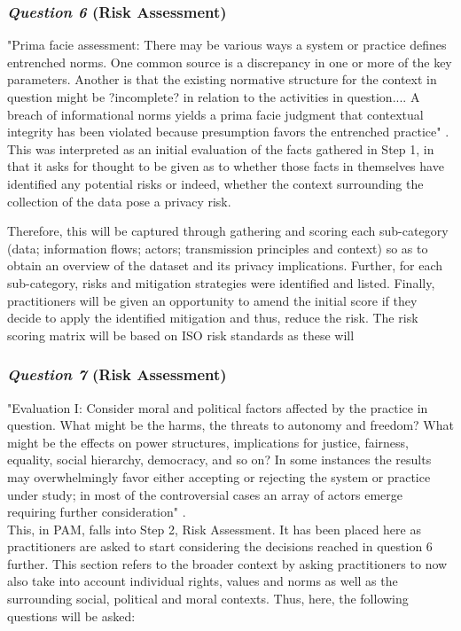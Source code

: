 \subsubsection {{\it Question 6} {\bf(Risk Assessment)}}
"Prima facie assessment: There may be various ways a system or practice defines entrenched norms. One common source is a discrepancy in one or more of the key parameters. Another is that the existing normative structure for the context in question might be ?incomplete? in relation to the activities in question.... A breach of informational norms yields a prima facie judgment that contextual integrity has been violated because presumption favors the entrenched practice" \cite{Nissenbaum_2010}.\\

This was interpreted as an initial evaluation of the facts gathered in Step 1, in that it asks for thought to be given as to whether those facts in themselves have identified any potential risks or indeed, whether the context surrounding the collection of the data pose a privacy risk.

Therefore, this will be captured through gathering and scoring each sub-category (data; information flows; actors; transmission principles and context) so as to obtain an overview of the dataset and its privacy implications. Further, for each sub-category, risks and mitigation strategies were identified and listed. Finally, practitioners will be given an opportunity to amend the initial score if they decide to apply the identified mitigation and thus, reduce the risk. The risk scoring matrix will be based on ISO risk standards as these will 
\subsubsection {{\it Question 7} {\bf(Risk Assessment)}}
"Evaluation I: Consider moral and political factors affected by the practice in question. What might be the harms, the threats to autonomy and freedom? What might be the effects on power structures, implications for justice, fairness, equality, social hierarchy, democracy, and so on? In some instances the results may overwhelmingly favor either accepting or rejecting the system or practice under study; in most of the controversial cases an array of actors emerge requiring further consideration" \cite{Nissenbaum_2010}.\\

This, in PAM, falls into Step 2, Risk Assessment. It has been placed here as practitioners are asked to start considering the decisions reached in question 6 further. This section refers to the broader context by asking practitioners to now also take into account individual rights, values and norms as well as the surrounding social, political and moral contexts. Thus, here, the following questions will be asked:\\

